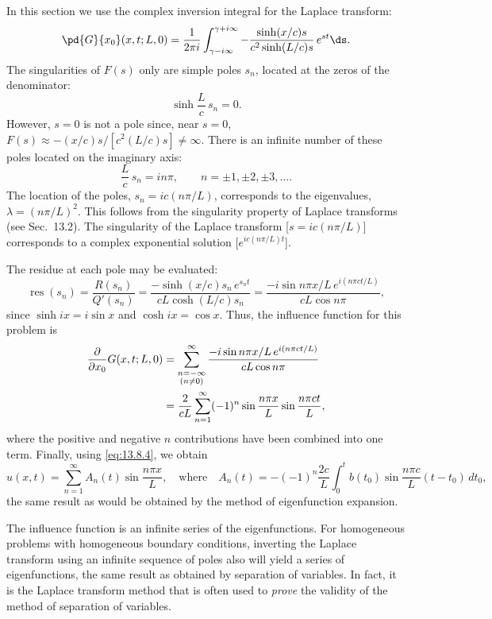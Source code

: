 In this section we use the complex inversion integral for the Laplace transform:
\begin{equation}
\pd{G}{x_0}(x,t;L,0) = \frac{1}{2\pi i}\int_{\gamma-i\infty}^{\gamma+i\infty}
-\frac{\sinh(x/c)s}{c^2\sinh(L/c)s}\,e^{st}\ds.
\label{eq:13.8.6}
\end{equation}
The singularities of $F(s)$ only are simple poles $s_n$, located at the zeros of the denominator:
\begin{equation}
\sinh\frac{L}{c}\,s_n = 0.
\label{eq:13.8.7}
\end{equation}
However, $s = 0$ is not a pole since, near $s = 0$, $F(s) \approx -(x/c)s/[c^2(L/c)s] \ne \infty$.  There is an infinite number of these poles located on the imaginary axis:
\begin{equation}
\frac{L}{c}\,s_n = in\pi, \qquad n = \pm 1, \pm 2, \pm 3, \dots.
\label{eq:13.8.8}
\end{equation}
The location of the poles, $s_n = ic(n\pi/L)$, corresponds to the eigenvalues, $\lambda = (n\pi/L)^2$.  This follows from the singularity property of Laplace transforms (see Sec.~13.2).  The singularity of the Laplace transform [$s = ic(n\pi/L)$] corresponds to a complex exponential solution [$e^{ic(n\pi/L)t}$].

The residue at each pole may be evaluated:
\[
\operatorname{res}(s_n) = \frac{R(s_n)}{Q'(s_n)}
= \frac{-\sinh(x/c)s_n\,e^{s_n t}}{cL\cosh(L/c)s_n}
= \frac{-i\sin n\pi x/L\,e^{i(n\pi ct/L)}}{cL\cos n\pi},
\]
since $\sinh ix = i\sin x$ and $\cosh ix = \cos x$.  Thus, the influence function for this problem is
\begin{align}
\frac{\partial}{\partial x_0}G(x,t;L,0)
&= \sum_{\substack{n=-\infty \\ (n\ne 0)}}^{\infty}
   \frac{-i\sin n\pi x/L\,e^{i(n\pi ct/L)}}{cL\cos n\pi} \notag\\
&= \frac{2}{cL}\sum_{n=1}^{\infty}(-1)^n\sin\frac{n\pi x}{L}\sin\frac{n\pi ct}{L},
\label{eq:13.8.9}
\end{align}
where the positive and negative $n$ contributions have been combined into one term.
Finally, using \eqref{eq:13.8.4}, we obtain
\[
u(x,t) = \sum_{n=1}^{\infty} A_n(t)\sin\frac{n\pi x}{L},
\quad\text{where}\quad
A_n(t) = -(-1)^n\frac{2c}{L}\int_0^t b(t_0)\sin\frac{n\pi c}{L}(t-t_0)\,dt_0,
\]
the same result as would be obtained by the method of eigenfunction expansion.

The influence function is an infinite series of the eigenfunctions.  For homogeneous problems with homogeneous boundary conditions, inverting the Laplace transform using an infinite sequence of poles also will yield a series of eigenfunctions, the same result as obtained by separation of variables.  In fact, it is the Laplace transform method that is often used to \emph{prove} the validity of the method of separation of variables.

